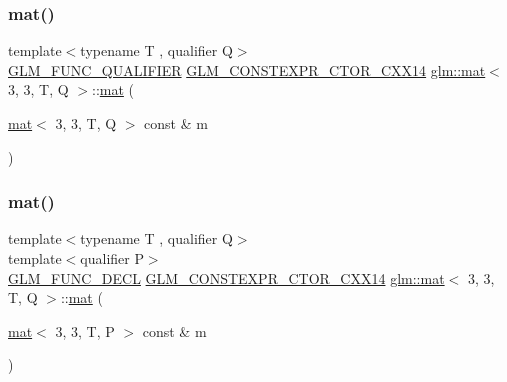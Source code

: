 \subsubsection{\texorpdfstring{mat()}{mat()}\hspace{0.1cm}{\footnotesize\ttfamily [2/21]}}
{\footnotesize\ttfamily template$<$typename T , qualifier Q$>$ \\
\mbox{\hyperlink{setup_8hpp_a33fdea6f91c5f834105f7415e2a64407}{G\+L\+M\+\_\+\+F\+U\+N\+C\+\_\+\+Q\+U\+A\+L\+I\+F\+I\+ER}} \mbox{\hyperlink{setup_8hpp_a0900f9145e68bf6061b6f5e7be3fa751}{G\+L\+M\+\_\+\+C\+O\+N\+S\+T\+E\+X\+P\+R\+\_\+\+C\+T\+O\+R\+\_\+\+C\+X\+X14}} \mbox{\hyperlink{structglm_1_1mat}{glm\+::mat}}$<$ 3, 3, T, Q $>$\+::\mbox{\hyperlink{structglm_1_1mat}{mat}} (\begin{DoxyParamCaption}\item[{\mbox{\hyperlink{structglm_1_1mat}{mat}}$<$ 3, 3, T, Q $>$ const \&}]{m }\end{DoxyParamCaption})}

\mbox{\label{structglm_1_1mat_3_013_00_013_00_01_t_00_01_q_01_4_a03d7907b53e23d522516d4cc951d9b43}} 
\subsubsection{\texorpdfstring{mat()}{mat()}\hspace{0.1cm}{\footnotesize\ttfamily [3/21]}}
{\footnotesize\ttfamily template$<$typename T , qualifier Q$>$ \\
template$<$qualifier P$>$ \\
\mbox{\hyperlink{setup_8hpp_ab2d052de21a70539923e9bcbf6e83a51}{G\+L\+M\+\_\+\+F\+U\+N\+C\+\_\+\+D\+E\+CL}} \mbox{\hyperlink{setup_8hpp_a0900f9145e68bf6061b6f5e7be3fa751}{G\+L\+M\+\_\+\+C\+O\+N\+S\+T\+E\+X\+P\+R\+\_\+\+C\+T\+O\+R\+\_\+\+C\+X\+X14}} \mbox{\hyperlink{structglm_1_1mat}{glm\+::mat}}$<$ 3, 3, T, Q $>$\+::\mbox{\hyperlink{structglm_1_1mat}{mat}} (\begin{DoxyParamCaption}\item[{\mbox{\hyperlink{structglm_1_1mat}{mat}}$<$ 3, 3, T, P $>$ const \&}]{m }\end{DoxyParamCaption})}

\mbox{\label{structglm_1_1mat_3_013_00_013_00_01_t_00_01_q_01_4_ae7d4ab687b52868f0dc63c6fa085de7f}} 
